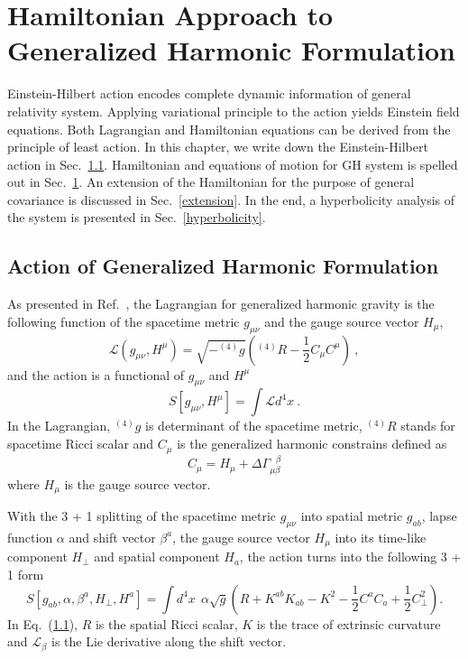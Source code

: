\chapter{Hamiltonian Approach to Generalized Harmonic Formulation}\label{hamiltonian}
Einstein-Hilbert action encodes complete dynamic information of general relativity system. Applying variational principle to the action yields Einstein field equations. Both Lagrangian and Hamiltonian equations can be derived from the principle of least action. In this chapter, we write down the Einstein-Hilbert action in Sec.~\ref{action}. Hamiltonian and equations of motion for GH system is spelled out in Sec.~\ref{hamiltonian}. An extension of the Hamiltonian for the purpose of general covariance is discussed in Sec.~\ref{extension}. In the end, a hyperbolicity analysis of the system is presented in Sec.~\ref{hyperbolicity}. 
\section{Action of Generalized Harmonic Formulation}\label{action}
As presented in Ref.~\cite{Brown:2010rya}, the Lagrangian for generalized harmonic gravity is the following function of the spacetime metric $g_{\mu\nu}$ and the gauge source vector $H_{\mu}$, 
\begin{equation}
\mathscr{L}\left(g_{\mu\nu}, H^{\mu}\right) = \sqrt{-^{(4)}g} \left(^{(4)}R - \frac{1}{2}C_{\mu}C^{\mu}\right) \ , 
\end{equation}
and the action is a functional of $g_{\mu\nu}$ and $H^{\mu}$
\begin{equation}\label{action}
S\left[g_{\mu\nu}, H^{\mu}\right] = \int \mathscr{L} d^{4}x \ .
\end{equation}
In the Lagrangian, $^{(4)}g$ is determinant of the spacetime metric, $^{(4)}R$ stands for spacetime Ricci scalar and $C_{\mu}$ is the generalized harmonic constrains defined as
\begin{equation}
C_{\mu} = H_{\mu} + \Delta \Gamma^{~~~\beta}_{\mu\beta}
\end{equation}
where $H_{\mu}$ is the gauge source vector. 

With the 3 + 1 splitting of the spacetime metric $g_{\mu\nu}$ into spatial metric $g_{ab}$, lapse function $\alpha$ and shift vector $\beta^{a}$, the gauge source vector $H_{\mu}$ into its time-like component $H_{\perp}$ and spatial component $H_{a}$, the action turns into the following 3 + 1 form
\begin{equation}\label{3+1action}
S\left[g_{ab}, \alpha, \beta^{a}, H_{\perp}, H^{a}\right] = \int d^{4}x~~\alpha \sqrt{g} \left( R + K^{ab}K_{ab} - K^{2} - \frac{1}{2}C^{a}C_{a} + \frac{1}{2}C_{\perp}^{2}\right).
\end{equation}
In Eq.~(\ref{action}), $R$ is the spatial Ricci scalar, $K$ is the trace of extrinsic curvature and $\mathcal{L}_{\beta}$ is the Lie derivative along the shift vector. 

